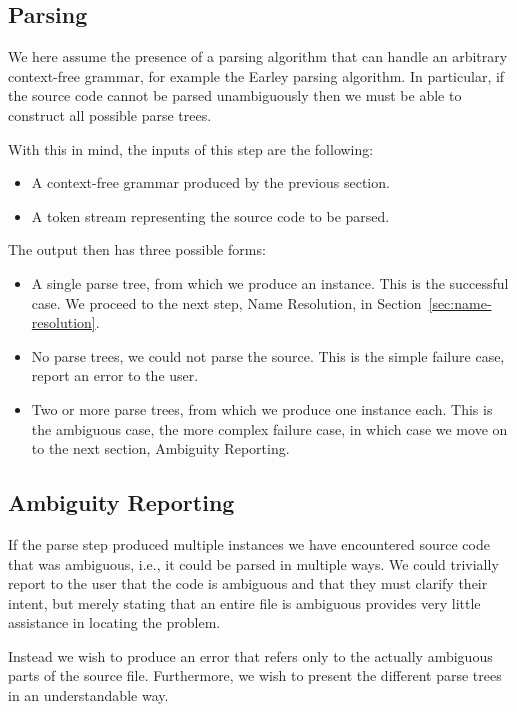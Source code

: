 \documentclass{kththesis}
\begin{document}
\subsection{Parsing} \label{sec:formalization-parsing}

We here assume the presence of a parsing algorithm that can handle an arbitrary context-free grammar, for example the Earley \cite{Earley1970An-Efficient-Co} parsing algorithm. In particular, if the source code cannot be parsed unambiguously then we must be able to construct all possible parse trees.

With this in mind, the inputs of this step are the following:

\begin{itemize}
  \item A context-free grammar produced by the previous section.
  \item A token stream representing the source code to be parsed.
\end{itemize}

The output then has three possible forms:

\begin{itemize}
  \item A single parse tree, from which we produce an instance. This is the successful case. We proceed to the next step, Name Resolution, in Section~\ref{sec:name-resolution}.
  \item No parse trees, we could not parse the source. This is the simple failure case, report an error to the user.
  \item Two or more parse trees, from which we produce one instance each. This is the ambiguous case, the more complex failure case, in which case we move on to the next section, Ambiguity Reporting.
\end{itemize}

\subsection{Ambiguity Reporting} \label{sec:implementation-ambiguity-detection}

If the parse step produced multiple instances we have encountered source code that was ambiguous, i.e., it could be parsed in multiple ways. We could trivially report to the user that the code is ambiguous and that they must clarify their intent, but merely stating that an entire file is ambiguous provides very little assistance in locating the problem.

Instead we wish to produce an error that refers only to the actually ambiguous parts of the source file. Furthermore, we wish to present the different parse trees in an understandable way.
\end{document}
